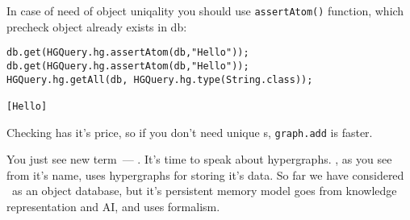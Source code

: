 In case of need of object uniqality you should use \verb$assertAtom()$ function,
which precheck object already exists in db:
\begin{verbatim}
db.get(HGQuery.hg.assertAtom(db,"Hello"));
db.get(HGQuery.hg.assertAtom(db,"Hello"));
HGQuery.hg.getAll(db, HGQuery.hg.type(String.class));

[Hello]
\end{verbatim}
Checking has it's price, so if you don't need unique s,
\verb$graph.add$ is faster.


You just see new term\ --- . It's time to speak about hypergraphs.
\hgdb, as you see from it's name, uses hypergraphs for storing it's data. So far
we have considered \hgdb\ as an object database, but it's persistent memory
model goes from knowledge representation and AI, and uses  formalism.

\secup